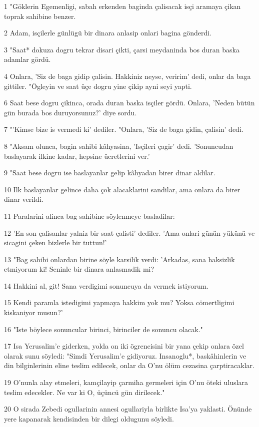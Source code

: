\par 1 "Göklerin Egemenligi, sabah erkenden baginda çalisacak isçi aramaya çikan toprak sahibine benzer.
\par 2 Adam, isçilerle günlügü bir dinara anlasip onlari bagina gönderdi.
\par 3 "Saat* dokuza dogru tekrar disari çikti, çarsi meydaninda bos duran baska adamlar gördü.
\par 4 Onlara, 'Siz de baga gidip çalisin. Hakkiniz neyse, veririm' dedi, onlar da baga gittiler. "Ögleyin ve saat üçe dogru yine çikip ayni seyi yapti.
\par 6 Saat bese dogru çikinca, orada duran baska isçiler gördü. Onlara, 'Neden bütün gün burada bos duruyorsunuz?' diye sordu.
\par 7 "'Kimse bize is vermedi ki' dediler. "Onlara, 'Siz de baga gidin, çalisin' dedi.
\par 8 "Aksam olunca, bagin sahibi kâhyasina, 'Isçileri çagir' dedi. 'Sonuncudan baslayarak ilkine kadar, hepsine ücretlerini ver.'
\par 9 "Saat bese dogru ise baslayanlar gelip kâhyadan birer dinar aldilar.
\par 10 Ilk baslayanlar gelince daha çok alacaklarini sandilar, ama onlara da birer dinar verildi.
\par 11 Paralarini alinca bag sahibine söylenmeye basladilar:
\par 12 'En son çalisanlar yalniz bir saat çalisti' dediler. 'Ama onlari günün yükünü ve sicagini çeken bizlerle bir tuttun!'
\par 13 "Bag sahibi onlardan birine söyle karsilik verdi: 'Arkadas, sana haksizlik etmiyorum ki! Seninle bir dinara anlasmadik mi?
\par 14 Hakkini al, git! Sana verdigimi sonuncuya da vermek istiyorum.
\par 15 Kendi paramla istedigimi yapmaya hakkim yok mu? Yoksa cömertligimi kiskaniyor musun?'
\par 16 "Iste böylece sonuncular birinci, birinciler de sonuncu olacak."
\par 17 Isa Yerusalim'e giderken, yolda on iki ögrencisini bir yana çekip onlara özel olarak sunu söyledi: "Simdi Yerusalim'e gidiyoruz. Insanoglu*, baskâhinlerin ve din bilginlerinin eline teslim edilecek, onlar da O'nu ölüm cezasina çarptiracaklar.
\par 19 O'nunla alay etmeleri, kamçilayip çarmiha germeleri için O'nu öteki uluslara teslim edecekler. Ne var ki O, üçüncü gün dirilecek."
\par 20 O sirada Zebedi ogullarinin annesi ogullariyla birlikte Isa'ya yaklasti. Önünde yere kapanarak kendisinden bir dilegi oldugunu söyledi.
